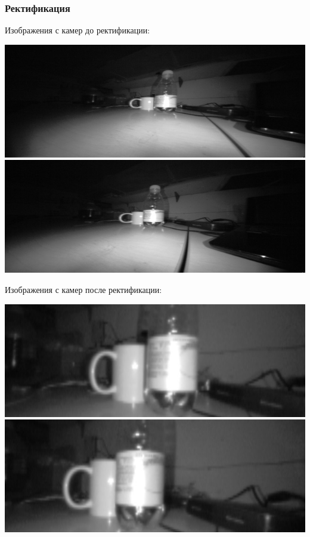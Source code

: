 \documentclass{beamer}
\begin{document}
		\begin{frame}
		    \frametitle{Ректификация}
		   
		    Изображения с камер до ректификации:
		    \vspace{-7mm}
            \begin{center}
				\includegraphics[scale=0.45]{images/raw0}
		    	\includegraphics[scale=0.45]{images/raw1}
			\end{center}
		   
		    Изображения с камер после ректификации:
		    \vspace{-7mm}
		    \begin{center}
				\includegraphics[scale=0.45]{images/rectL}
				\includegraphics[scale=0.45]{images/rectR}
			\end{center}
		\end{frame}
		
\end{document}
